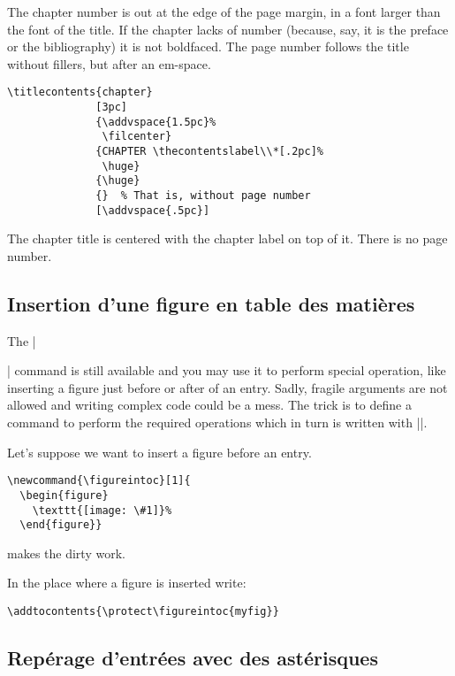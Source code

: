 \documentclass[a4paper]{ltxguide}
\newcommand{\tradfin}{\ding{54}\color{black}}
\begin{document}
The chapter number is out at the edge of the page margin, in a font
larger than the font of the title. If the chapter lacks of number
(because, say, it is the preface or the bibliography) it is not
boldfaced. The page number follows the title without fillers, but
after an em-space.

\begin{verbatim}
\titlecontents{chapter}
              [3pc]
              {\addvspace{1.5pc}%
               \filcenter}
              {CHAPTER \thecontentslabel\\*[.2pc]%
               \huge}
              {\huge}
              {}  % That is, without page number
              [\addvspace{.5pc}]
\end{verbatim}
              
The chapter title is centered with the chapter label on top
of it. There is no page number.

\subsection{Insertion d'une figure en table des matières}

The |\addtocontents| command is still available and you may use
it to perform special operation, like inserting a figure just before
or after of an entry. Sadly, fragile
arguments are not allowed and writing complex code could be a mess.
The trick is to define a command to perform the required operations
which in turn is written with |\protect|.

Let's suppose we want to insert a figure before an entry.
\begin{verbatim}
\newcommand{\figureintoc}[1]{
  \begin{figure}
    \texttt{[image: \#1]}%
  \end{figure}}
\end{verbatim}
makes the dirty work.

In the place where a figure is inserted write:
\begin{verbatim}
\addtocontents{\protect\figureintoc{myfig}}
\end{verbatim}
\tradfin

\subsection{Repérage d'entrées avec des astérisques}
\end{document}
